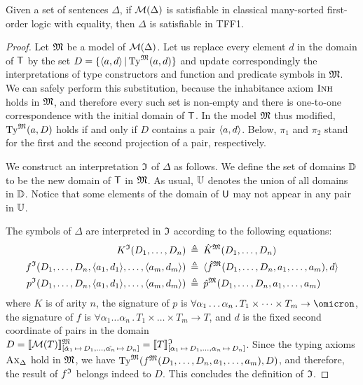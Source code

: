 \begin{theorem} \label{thm:mon_compl}
Given a set of sentences $\Delta$, if $\mathcal{M}(\Delta)$
is satisfiable in classical many-sorted first-order logic
with equality, then $\Delta$ is satisfiable in TFF1.
\end{theorem}
\begin{proof}
Let $\mathfrak{M}$ be a model of $\mathcal{M}(\Delta)$. Let us replace every element $d$ in
the domain of $\mathsf{T}$ by the set $D = \{\langle a,d \rangle \,|\, \mathrm{Ty}^{\mathfrak{M}}(a,d)\}$
and update correspondingly the interpretations of type constructors
and function and predicate symbols in $\mathfrak{M}$.
We can safely perform this substitution, because the inhabitance
axiom $\text{\sc Inh}$ holds in $\mathfrak{M}$, and therefore every such set is non-empty
and there is one-to-one correspondence with the initial domain of $\mathsf{T}$.
In the model $\mathfrak{M}$ thus modified, $\mathrm{Ty}^{\mathfrak{M}}(a,D)$ holds if and only if
$D$ contains a pair $\langle a,d \rangle$.
%
Below, $\pi_1$ and $\pi_2$ stand for the first and the second projection
of a pair, respectively.

We construct an interpretation $\mathfrak{I}$ of $\Delta$ as follows.
We define the set of domains $\mathbb{D}$ to be the new domain
of $\mathsf{T}$ in $\mathfrak{M}$. As usual, $\mathbb{U}$ denotes the union
of all domains in $\mathbb{D}$. Notice that some elements of
the domain of $\mathsf{U}$ may not appear in any pair in $\mathbb{U}$.

The symbols of $\Delta$ are interpreted in $\mathfrak{I}$
according to the following equations:
\begin{align*}
K^{\mathfrak{I}}(D_1,\dots,D_n) &\:\triangleq\: \hat{K}^{\mathfrak{M}}(D_1,\dots,D_n) \\
f^{\mathfrak{I}}(D_1,\dots,D_n,\langle a_1,d_1 \rangle,\dots,\langle a_m,d_m \rangle) &\:\triangleq\:
\langle \hat{f}^{\mathfrak{M}}(D_1,\dots,D_n,a_1,\dots,a_m), d \rangle \\
p^{\mathfrak{I}}(D_1,\dots,D_n,\langle a_1,d_1 \rangle,\dots,\langle a_m,d_m \rangle) &\:\triangleq\:
\hat{p}^{\mathfrak{M}}(D_1,\dots,D_n,a_1,\dots,a_m)
\end{align*}
where
$K$ is of arity $n$,
the signature of $p$ is
$\forall \alpha_1\dots\alpha_n \,.\, T_1 \times \dots \times T_m \to
\omicron$,
the signature of $f$ is
$\forall \alpha_1\dots\alpha_n \,.\, T_1 \times \dots \times T_m \to T$,
and $d$ is the fixed second coordinate of pairs in the domain
$D = \llbracket \mathcal{M}(T) \rrbracket^{\mathfrak{M}}_{[\hat{\alpha}_1\,\mapsto\,D_1,\dots,
\hat{\alpha_n}\,\mapsto\,D_n]} =
\llbracket T \rrbracket^{\mathfrak{I}}_{[\alpha_1\,\mapsto\,D_1,\dots,\alpha_n\,\mapsto\,D_n]}$.
Since the typing axioms $\text{\sc Ax}_{\Delta}$ hold in $\mathfrak{M}$, we have
$\mathrm{Ty}^{\mathfrak{M}}(f^{\mathfrak{M}}(D_1,\dots,D_n,a_1,\dots,a_m), D)$,
and therefore, the result of $f^{\mathfrak{I}}$ belongs indeed to $D$.
This concludes the definition of $\mathfrak{I}$.


\end{proof}

